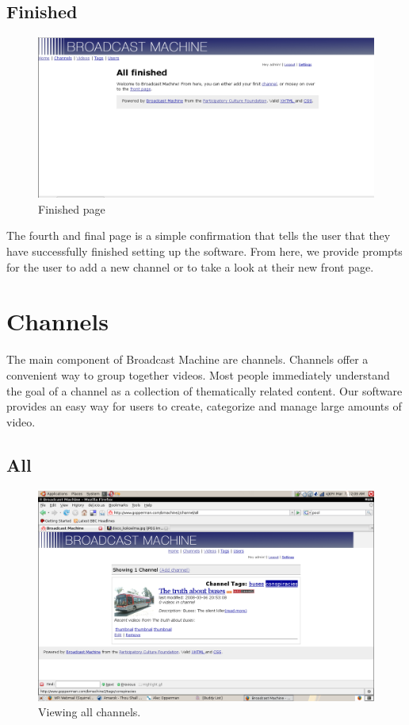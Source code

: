 \documentclass[a4paper,12pt]{report}
\begin{document}
\subsection{Finished}
\begin{figure}[h!]
\begin{center}
\includegraphics[width=150mm]{./images/setup4.png}
\caption{Finished page}
\end{center}
\end{figure}

The fourth and final page is a simple confirmation that tells the user that they have successfully finished setting up the software.
From here, we provide prompts for the user to add a new channel or to take a look at their new front page.

\section{Channels}
The main component of Broadcast Machine are channels.
Channels offer a convenient way to group together videos.
Most people immediately understand the goal of a channel as a collection of thematically related content.
Our software provides an easy way for users to create, categorize and manage large amounts of video.

\subsection{All}
\begin{figure}[h]
\begin{center}
\includegraphics[width=150mm]{./images/channelall.png}
\end{center}
\caption{Viewing all channels.}
\end{figure}
\end{document}
